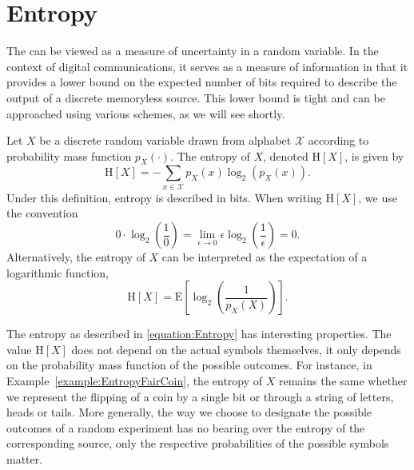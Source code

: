 \section{Entropy}

The  can be viewed as a measure of uncertainty in a random variable.
In the context of digital communications, it serves as a measure of information in that it provides a lower bound on the expected number of bits required to describe the output of a discrete memoryless source.
This lower bound is tight and can be approached using various schemes, as we will see shortly.

\begin{definition}[Entropy]
Let $X$ be a discrete random variable drawn from alphabet $\mathcal{X}$ according to probability mass function $p_X(\cdot)$.
The entropy of $X$, denoted $\mathrm{H}[X]$, is given by
\begin{equation} \label{equation:Entropy}
\mathrm{H}[X] = - \sum_{x \in \mathcal{X}} p_X (x) \log_2 ( p_X(x) ) .
\end{equation}
Under this definition, entropy is described in bits.
When writing $\mathrm{H}[X]$, we use the convention
\begin{equation*}
0 \cdot \log_2 \left( \frac{1}{0} \right)
= \lim_{\epsilon \rightarrow 0} \epsilon \log_2 \left( \frac{1}{\epsilon} \right)
= 0 .
\end{equation*}
Alternatively, the entropy of $X$ can be interpreted as the expectation of a logarithmic function,
\begin{equation*}
\mathrm{H}[X] = \mathrm{E} \left[ \log_2 \left( \frac{1}{p_X(X)} \right) \right] .
\end{equation*}
\end{definition}

The entropy as described in \eqref{equation:Entropy} has interesting properties.
The value $\mathrm{H}[X]$ does not depend on the actual symbols themselves, it only depends on the probability mass function of the possible outcomes.
For instance, in Example~\ref{example:EntropyFairCoin}, the entropy of $X$ remains the same whether we represent the flipping of a coin by a single bit or through a string of letters, heads or tails.
More generally, the way we choose to designate the possible outcomes of a random experiment has no bearing over the entropy of the corresponding source, only the respective probabilities of the possible symbols matter.

